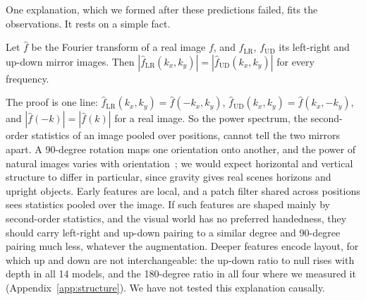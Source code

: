 One explanation, which we formed after these predictions failed, fits the observations. It rests on a simple fact.

\begin{lemma}\label{lem:spectrum}
Let $\hat f$ be the Fourier transform of a real image $f$, and $f_{\mathrm{LR}}$, $f_{\mathrm{UD}}$ its left-right and
up-down mirror images. Then $|\hat f_{\mathrm{LR}}(k_x, k_y)| = |\hat f_{\mathrm{UD}}(k_x, k_y)|$ for every frequency.
\end{lemma}

\noindent The proof is one line: $\hat f_{\mathrm{LR}}(k_x,k_y) = \hat f(-k_x, k_y)$, $\hat f_{\mathrm{UD}}(k_x,k_y) =
\hat f(k_x,-k_y)$, and $|\hat f(-k)| = |\hat f(k)|$ for a real image. So the power spectrum, the second-order statistics
of an image pooled over positions, cannot tell the two mirrors apart. A 90-degree rotation maps one orientation onto
another, and the power of natural images varies with orientation~\citep{vanderschaaf1996modelling,%
torralba2003statistics}; we would expect horizontal and vertical structure to differ in particular, since gravity gives
real scenes horizons and upright objects. Early features are local, and a patch filter shared across positions sees
statistics pooled over the image. If such features are shaped mainly by second-order statistics, and the visual world
has no preferred handedness, they should carry left-right and up-down pairing to a similar degree and 90-degree
pairing much less, whatever the augmentation. Deeper features encode layout, for which up and down are not
interchangeable: the up-down ratio to null rises with depth in all 14 models, and the 180-degree ratio in all
four where we measured it (Appendix~\ref{app:structure}). We have not tested this explanation causally.
